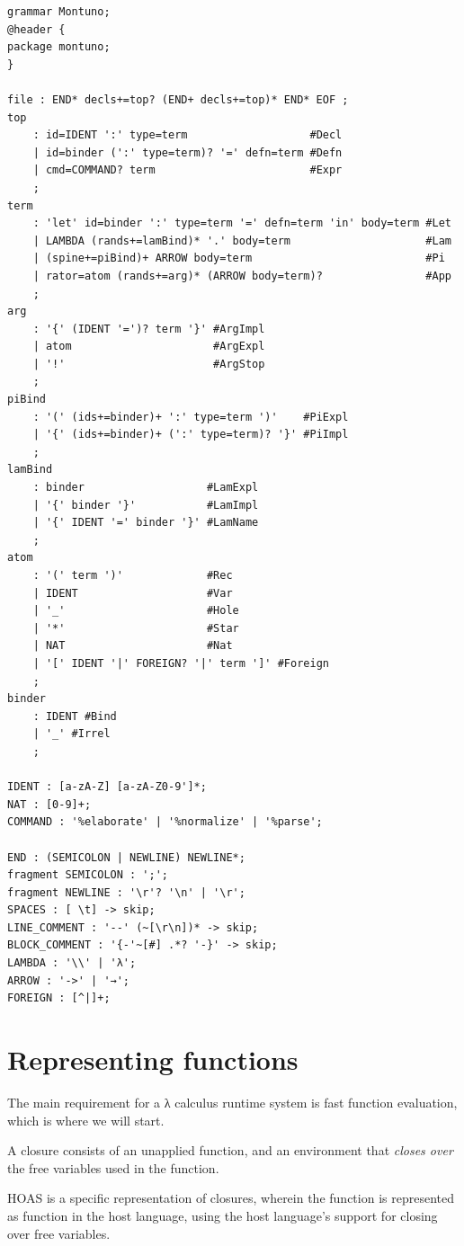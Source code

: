 \documentclass[english,zadani,odsaz]{fitthesis}
\begin{document}
\begin{verbatim}
grammar Montuno;
@header {
package montuno;
}

file : END* decls+=top? (END+ decls+=top)* END* EOF ;
top
    : id=IDENT ':' type=term                   #Decl
    | id=binder (':' type=term)? '=' defn=term #Defn
    | cmd=COMMAND? term                        #Expr
    ;
term
    : 'let' id=binder ':' type=term '=' defn=term 'in' body=term #Let
    | LAMBDA (rands+=lamBind)* '.' body=term                     #Lam
    | (spine+=piBind)+ ARROW body=term                           #Pi
    | rator=atom (rands+=arg)* (ARROW body=term)?                #App
    ;
arg
    : '{' (IDENT '=')? term '}' #ArgImpl
    | atom                      #ArgExpl
    | '!'                       #ArgStop
    ;
piBind
    : '(' (ids+=binder)+ ':' type=term ')'    #PiExpl
    | '{' (ids+=binder)+ (':' type=term)? '}' #PiImpl
    ;
lamBind
    : binder                   #LamExpl
    | '{' binder '}'           #LamImpl
    | '{' IDENT '=' binder '}' #LamName
    ;
atom
    : '(' term ')'             #Rec
    | IDENT                    #Var
    | '_'                      #Hole
    | '*'                      #Star
    | NAT                      #Nat
    | '[' IDENT '|' FOREIGN? '|' term ']' #Foreign
    ;
binder
    : IDENT #Bind
    | '_' #Irrel
    ;

IDENT : [a-zA-Z] [a-zA-Z0-9']*;
NAT : [0-9]+;
COMMAND : '%elaborate' | '%normalize' | '%parse';

END : (SEMICOLON | NEWLINE) NEWLINE*;
fragment SEMICOLON : ';';
fragment NEWLINE : '\r'? '\n' | '\r';
SPACES : [ \t] -> skip;
LINE_COMMENT : '--' (~[\r\n])* -> skip;
BLOCK_COMMENT : '{-'~[#] .*? '-}' -> skip;
LAMBDA : '\\' | 'λ';
ARROW : '->' | '→';
FOREIGN : [^|]+;
\end{verbatim}

\section{Representing functions}
\label{sec:org071d325}
The main requirement for a λ calculus runtime system is fast function
evaluation, which is where we will start.


A closure consists of an unapplied function, and an environment that \emph{closes over}
the free variables used in the function.

HOAS is a specific representation of closures, wherein the function is
represented as function in the host language, using the host language's support
for closing over free variables.
\end{document}
